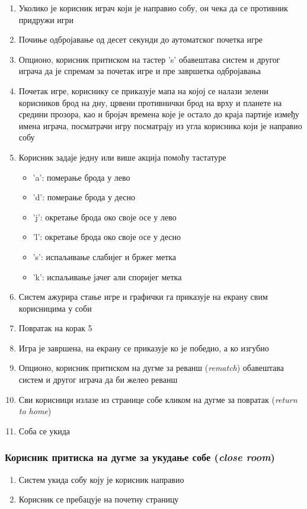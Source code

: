 \begin{enumerate}
    \item Уколико је корисник играч који је направио собу, он чека да се противник придружи игри
    \item Почиње одбројавање од десет секунди до аутоматског почетка игре
    \item Опционо, корисник притиском на тастер 's' обавештава систем и другог играча да је 
         спремам за почетак игре и пре завршетка одбројавања
    \item Почетак игре, кориснику се приказује мапа на којој се налази зелени корисников брод на дну, 
	црвени противнички брод на врху и планете на средини прозора, као и бројач времена које
	је остало до краја партије између имена играча, посматрачи игру посматрају из угла 
	корисника који је направио собу
    \item Корисник задаје једну или више акција помоћу тастатуре
	\begin{itemize}
	    \item 'a': померање брода у лево
	    \item 'd': померање брода у десно
	    \item 'j': окретање брода око своје осе у лево
	    \item 'l': окретање брода око своје осе у десно
	    \item 's': испаљивање слабијег и бржег метка
	    \item 'k': испаљивање јачег али споријег метка
	\end{itemize}
    \item Систем ажурира стање игре и графички га приказује на екрану свим корисницима
          у соби
    \item Повратак на корак 5
    \item Игра је завршена, на екрану се приказује ко је победио, а ко изгубио
    \item Опционо, корисник притиском на дугме за реванш (\textit{rematch}) обавештава систем и другог 
	играча да би желео реванш
\item Сви корисници излазе из странице собе кликом на дугме за повратак (\textit{return to home})
    \item Соба се укида
\end{enumerate}

\subsubsection{Корисник притиска на дугме за укудање собе (\textit{close room})}
\begin{enumerate}[label=1.\arabic*]
	\item Систем укида собу коју је корисник направио
	\item Корисник се пребацује на почетну страницу
\end{enumerate}

